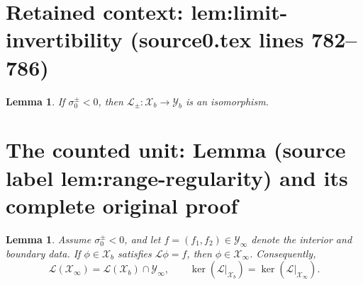 \documentclass[10pt,a4paper]{amsart}
\theoremstyle{plain}
\newtheorem{lemma}[theorem]{Lemma}
\begin{document}
\section*{Retained context: lem:limit-invertibility (source0.tex lines 782--786)}

	\begin{lemma}\label{lem:limit-invertibility}
	If $\sigma_0^{\pm}<0$, then
	$\mathscr{L}_{\pm}:\mathscr{X}_b\to \mathscr{Y}_b$
	is an isomorphism.
	\end{lemma}


\section{The counted unit: Lemma (source label lem:range-regularity) and its complete original proof}

	\begin{lemma}\label{lem:range-regularity}
	{Assume $\sigma_0^\pm<0$, and let $f=(f_1,f_2)\in\mathscr Y_\infty$ denote the interior and boundary data. If $\phi\in\mathscr X_b$ satisfies $\mathscr L\phi=f$, then $\phi\in\mathscr X_\infty$. Consequently,}
	\begin{equation}\label{eq:range-intersection}
		\mathscr L(\mathscr X_\infty)=\mathscr L(\mathscr X_b)\cap\mathscr Y_\infty,
		\qquad
		\ker(\mathscr L|_{\mathscr X_b})
		=\ker(\mathscr L|_{\mathscr X_\infty}).
		\end{equation}
	\end{lemma}
\end{document}
